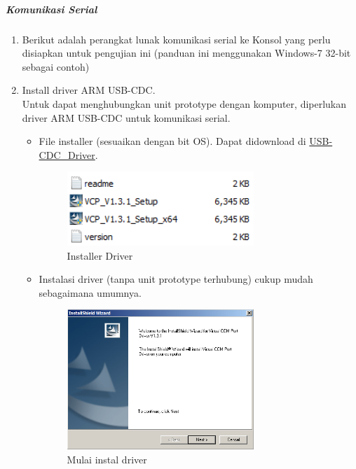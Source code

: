 \documentclass{article}
\begin{document}
	\subparagraph{Komunikasi Serial}
	
	\begin{enumerate}
		\item Berikut adalah perangkat lunak komunikasi serial ke Konsol yang perlu disiapkan untuk pengujian ini (panduan ini menggunakan Windows-7 32-bit sebagai contoh)
		
		\item Install driver ARM USB-CDC.\\
		Untuk dapat menghubungkan unit prototype dengan komputer,
		diperlukan driver ARM USB-CDC untuk komunikasi serial.
		
		\begin{itemize}
			\item File installer (sesuaikan dengan bit OS).
			Dapat didownload di \href{https://drive.google.com/drive/folders/19gXVrxR68SFHQUGGGgKb0Da03oV7Rh41?usp=share_link}{USB-CDC\_Driver}.
			\begin{figure}[H]
				\centering
				\includegraphics[width=200pt]{images/software/driver}
				\caption{Installer Driver}
			\end{figure}
			
			\item Instalasi driver (tanpa unit prototype terhubung) cukup mudah sebagaimana umumnya.
			\begin{figure}[H]
				\centering
				\includegraphics[width=200pt]{images/software/install_driver}
				\caption{Mulai instal driver}
			\end{figure}
		\end{itemize}
		

\end{enumerate}
\end{document}
